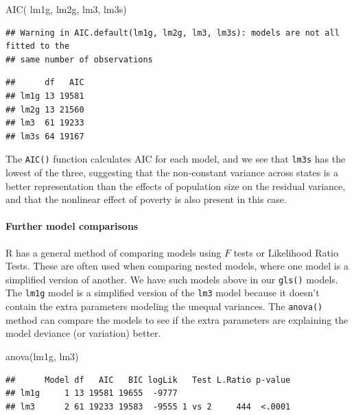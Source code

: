 \documentclass[
]{article}
\newenvironment{Shaded}{\begin{snugshade}}{\end{snugshade}}
\newcommand{\FunctionTok}[1]{\textcolor[rgb]{0.00,0.00,0.00}{#1}}
\newcommand{\NormalTok}[1]{#1}
\begin{document}
\begin{Shaded}
\begin{Highlighting}[]
\FunctionTok{AIC}\NormalTok{( lm1g,  lm2g, lm3, lm3s)}
\end{Highlighting}
\end{Shaded}

\begin{verbatim}
## Warning in AIC.default(lm1g, lm2g, lm3, lm3s): models are not all fitted to the
## same number of observations
\end{verbatim}

\begin{verbatim}
##      df   AIC
## lm1g 13 19581
## lm2g 13 21560
## lm3  61 19233
## lm3s 64 19167
\end{verbatim}

The \texttt{AIC()} function calculates AIC for each model, and we see that \texttt{lm3s} has the lowest of the three, suggesting that the non-constant variance across states is a better representation than the effects of population size on the residual variance, and that the nonlinear effect of poverty is also present in this case.

\hypertarget{further-model-comparisons}{%
\paragraph{Further model comparisons}\label{further-model-comparisons}}

R has a general method of comparing models using \(F\) tests or Likelihood Ratio Tests. These are often used when comparing nested models, where one model is a simplified version of another. We have such models above in our \texttt{gls()} models. The \texttt{lm1g} model is a simplified version of the \texttt{lm3} model because it doesn't contain the extra parameters modeling the unequal variances. The \texttt{anova()} method can compare the models to see if the extra parameters are explaining the model deviance (or variation) better.

\begin{Shaded}
\begin{Highlighting}[]
\FunctionTok{anova}\NormalTok{(lm1g, lm3)}
\end{Highlighting}
\end{Shaded}

\begin{verbatim}
##      Model df   AIC   BIC logLik   Test L.Ratio p-value
## lm1g     1 13 19581 19655  -9777                       
## lm3      2 61 19233 19583  -9555 1 vs 2     444  <.0001
\end{verbatim}
\end{document}
